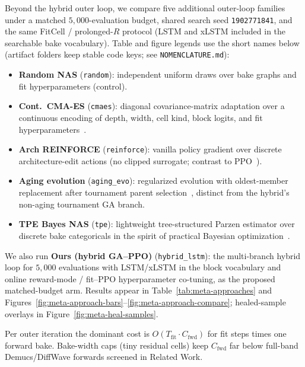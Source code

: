 Beyond the hybrid outer loop, we compare five additional outer-loop families under a matched $5{,}000$-evaluation budget, shared search seed \texttt{1902771841}, and the same FitCell / prolonged-$R$ protocol (LSTM and xLSTM included in the searchable bake vocabulary).
Table and figure legends use the short names below (artifact folders keep stable code keys; see \texttt{NOMENCLATURE.md}):
\begin{itemize}
  \item \textbf{Random NAS} (\texttt{random}): independent uniform draws over bake graphs and fit hyperparameters (control).
  \item \textbf{Cont.\ CMA-ES} (\texttt{cmaes}): diagonal covariance-matrix adaptation over a continuous encoding of depth, width, cell kind, block logits, and fit hyperparameters~\cite{hansen2016cmaes}.
  \item \textbf{Arch REINFORCE} (\texttt{reinforce}): vanilla policy gradient over discrete architecture-edit actions (no clipped surrogate; contrast to PPO~\cite{schulman2017,zoph2017nas}).
  \item \textbf{Aging evolution} (\texttt{aging\_evo}): regularized evolution with oldest-member replacement after tournament parent selection~\cite{real2017large,real2019}, distinct from the hybrid's non-aging tournament GA branch.
  \item \textbf{TPE Bayes NAS} (\texttt{tpe}): lightweight tree-structured Parzen estimator over discrete bake categoricals in the spirit of practical Bayesian optimization~\cite{snoek2012}.
\end{itemize}
We also run \textbf{Ours (hybrid GA--PPO)} (\texttt{hybrid\_lstm}): the multi-branch hybrid loop for $5{,}000$ evaluations with LSTM/xLSTM in the block vocabulary and online reward-mode / fit--PPO hyperparameter co-tuning, as the proposed matched-budget arm.
Results appear in Table~\ref{tab:meta-approaches} and Figures~\ref{fig:meta-approach-bars}--\ref{fig:meta-approach-compare}; healed-sample overlays in Figure~\ref{fig:meta-heal-samples}.

\begin{remark}
\label{rem:complexity}
Per outer iteration the dominant cost is $O(T_{\mathrm{fit}}\cdot C_{\mathrm{fwd}})$ for fit steps times one forward bake.
Bake-width caps (tiny residual cells) keep $C_{\mathrm{fwd}}$ far below full-band Demucs/DiffWave forwards screened in Related Work.
\end{remark}



